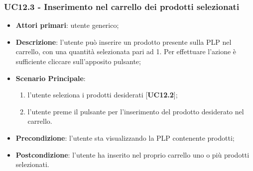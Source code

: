 \subsubsection{UC12.3 - Inserimento nel carrello dei prodotti selezionati}
\begin{itemize}
\item \textbf{Attori primari}: utente generico;
\item \textbf{Descrizione}: l'utente può inserire un prodotto presente sulla PLP nel carrello, con una quantità selezionata pari ad 1. Per effettuare l'azione è sufficiente cliccare sull'apposito pulsante;
\item \textbf{Scenario Principale}:
\begin{enumerate}
\item l'utente seleziona i prodotti desiderati [\textbf{UC12.2}];
\item l'utente preme il pulsante per l'inserimento del prodotto desiderato nel carrello.
\end{enumerate}
\item \textbf{Precondizione}: l'utente sta visualizzando la PLP contenente prodotti;
\item \textbf{Postcondizione}: l'utente ha inserito nel proprio carrello uno o più prodotti selezionati.
\end{itemize}

